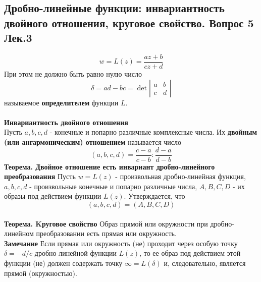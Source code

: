 \documentclass{article}
\begin{document}
\subsection{Дробно-линейные функции: инвариантность двойного отношения,  круговое свойство. Вопрос 5 Лек.3}
	\begin{equation}
	w=L(z)=\frac{a z+b}{c z+d}
	\end{equation}
	При этом не должно быть равно нулю число
	\begin{equation}
	\delta=a d-b c=\operatorname{det}\left|\begin{array}{ll}
	a & b \\
	c & d
	\end{array}\right|
	\end{equation}
	называемое \textbf{определителем} функции $L$.\\
	\\
	\textbf{Инвариантность двойного отношения}\\
	Пусть $ a, b, c, d$ - конечные и попарно различные комплексные числа. Их \textbf{двойным (или ангармоническим) отношением} называется число
	\begin{equation}
	(a, b, c, d)=\frac{c-a}{c-b}: \frac{d-a}{d-b}
	\end{equation}
	\textbf{Теорема. Двойное отношение есть инвариант дробно-линейного преобразования}
	Пусть $ w=L(z)$ - произвольная дробно-линейная функция, $ a, b, c, d$ - произвольные конечные и попарно различные числа, $ A, B, C, D$ - их образы под действием функции $ L(z) $. Утверждается, что
	\begin{equation}
	(a, b, c, d)=(A, B, C, D)
	\end{equation}
	\\
	\textbf{Теорема. Kруговое свойство} Образ прямой или окружности при дробно-линейном преобразовании есть прямая или окружность.\\
	\textbf{Замечание} Если прямая или окружность (не) проходит через особую точку $ \delta=-d / c $ дробно-линейной функции $ L(z)$, то ее образ под действием этой функции (не) должен содержать точку $ \infty=L(\delta) $ и, следовательно, является прямой (окружностью). 
\end{document}
